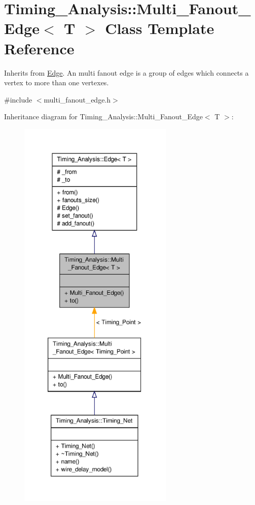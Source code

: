 \hypertarget{classTiming__Analysis_1_1Multi__Fanout__Edge}{\section{Timing\-\_\-\-Analysis\-:\-:Multi\-\_\-\-Fanout\-\_\-\-Edge$<$ T $>$ Class Template Reference}
\label{classTiming__Analysis_1_1Multi__Fanout__Edge}
}


Inherits from \hyperlink{classTiming__Analysis_1_1Edge}{Edge}. An multi fanout edge is a group of edges which connects a vertex to more than one vertexes.  




{\ttfamily \#include $<$multi\-\_\-fanout\-\_\-edge.\-h$>$}



Inheritance diagram for Timing\-\_\-\-Analysis\-:\-:Multi\-\_\-\-Fanout\-\_\-\-Edge$<$ T $>$\-:\nopagebreak
\begin{figure}[H]
\begin{center}
\leavevmode
\includegraphics[height=550pt]{classTiming__Analysis_1_1Multi__Fanout__Edge__inherit__graph}
\end{center}
\end{figure}


